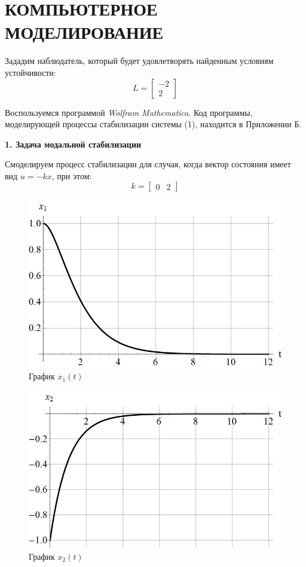 \chapter{\MakeUppercase{Компьютерное моделирование}}

Зададим наблюдатель, который будет удовлетворять найденным условиям устойчивости:
$$
L=\begin{bmatrix}
    -2 \\ 2
\end{bmatrix}
$$

Воспользуемся программой \textit{Wolfram Mathematica}. Код программы, моделирующей процессы стабилизации системы (1), находится в Приложении Б.

\textbf{1. Задача модальной стабилизации}

Смоделируем процесс стабилизации для случая, когда вектор состояния имеет вид $ u=-kx $, при этом:
$$
k=\begin{bmatrix} 0 & 2 \end{bmatrix}
$$

\begin{figure}[h]
    \centering
    \includegraphics[scale=0.4]{chapter_x6/fig1.png}
    \caption{График $ x_1(t) $}
    \label{1}
\end{figure}


\begin{figure}[h]
    \centering
    \includegraphics[scale=0.4]{chapter_x6/fig2.png}
    \caption{График $ x_2(t) $ }
    \label{1}
\end{figure}

